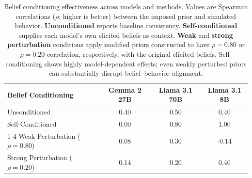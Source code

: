 \begin{table}[htbp]
  \centering
  \small
  \begin{tabular}{l|ccc}
    \toprule
    \textbf{Belief Conditioning} & \textbf{Gemma 2 27B} & \textbf{Llama 3.1 70B} & \textbf{Llama 3.1 8B} \\
    \midrule
    Unconditioned & 0.40 & 0.50 & 0.40 \\
    Self-Conditioned & 0.00 & 0.80 & 1.00 \\
    \cmidrule{1-4}
    Weak Perturbation ($\rho=0.80$) & 0.08 & 0.30 & -0.14 \\
    Strong Perturbation ($\rho=0.20$) & 0.14 & 0.20 & 0.40 \\
    \bottomrule
  \end{tabular}
  \caption{
    Belief conditioning effectiveness across models and methods. Values are Spearman correlations ($\rho$; higher is better) between the imposed prior and simulated behavior. \textbf{Unconditioned} reports baseline consistency. \textbf{Self-conditioned} supplies each model's own elicited beliefs as context. \textbf{Weak} and \textbf{strong perturbation} conditions apply modified priors constructed to have $\rho=0.80$ or $\rho=0.20$ correlation, respectively, with the original elicited beliefs. Self-conditioning shows highly model-dependent effects; even weakly perturbed priors can substantially disrupt belief--behavior alignment.
  }
  \label{tab:belief-conditioning}
\end{table}
